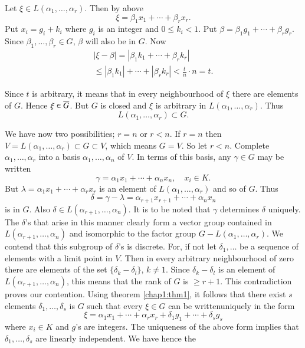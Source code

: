 Let $\xi\in L(\alpha_{1},\ldots,\alpha_{r})$. Then by above
$$
\xi=\beta_{1}x_{1}+\cdots+\beta_{r}x_{r}.
$$
Put $x_{i}=g_{i}+k_{i}$ where $g_{i}$ is an integer and $0\leqslant
k_{i}<1$. Put $\beta=\beta_{1}g_{1}+\cdots+\beta_{r}g_{r}$. Since
$\beta_{1},\ldots,\beta_{r}\in G$, $\beta$ will also be in $G$. Now
\begin{gather*}
|\xi-\beta|=|\beta_{1}k_{1}+\cdots+\beta_{r}k_{r}|\\
\leqslant |\beta_{1}k_{1}|+\cdots+|\beta_{r}k_{r}|<\frac{t}{n}\cdot n=t.
\end{gather*}\pageoriginale

Since $t$ is arbitrary, it means that in every neighbourhood of $\xi$
there are elements of $G$. Hence $\xi\in\overline{G}$. But $G$ is closed and
$\xi$ is arbitrary in $L(\alpha_{1},\ldots,\alpha_{r})$. Thus
$$
L(\alpha_{1},\ldots,\alpha_{r})\subset G.
$$

We have now two possibilities; $r=n$ or $r<n$. If $r=n$ then
$V=L(\alpha_{1},\ldots,\alpha_{r})\subset G\subset V$, which means
$G=V$. So let $r<n$. Complete $\alpha_{1},\ldots,\alpha_{r}$ into a
basis $\alpha_{1},\ldots,\alpha_{n}$ of $V$. In terms of this basis,
any $\gamma\in G$ may be written
$$
\gamma=\alpha_{1}x_{1}+\cdots+\alpha_{n}x_{n},\quad x_{i}\in K.
$$
But $\lambda=\alpha_{1}x_{1}+\cdots+\alpha_{r}x_{r}$ is an element of
$L(\alpha_{1},\ldots,\alpha_{r})$ and so of $G$. Thus
$$
\delta=\gamma-\lambda=\alpha_{r+1}x_{r+1}+\cdots+\alpha_{n}x_{n}
$$
is in $G$. Also $\delta\in L(\alpha_{r+1},\ldots,\alpha_{n})$. It is
to be noted that $\gamma$ determines $\delta$ uniquely. The $\delta$'s
that arise in this manner clearly form a vector group contained in
$L(\alpha_{r+1},\ldots,\alpha_{n})$ and isomorphic to the factor
group $G-L(\alpha_{1},\ldots,\alpha_{r})$. We contend that this
subgroup of $\delta$'s is discrete. For, if not let
$\delta_{1},\ldots$ be a sequence of elements with a limit point in
$V$. Then in every arbitrary neighbourhood of zero there are elements
of the set $\{\delta_{k}-\delta_{l}\}$, $k\neq 1$. Since
$\delta_{k}-\delta_{l}$ is an element of
$L(\alpha_{r+1},\ldots,\alpha_{n})$, this means that the rank of $G$
is $\geqslant r+1$. This contradiction proves our contention. Using
theorem \ref{chap1:thm1}, it follows that there exist $s$ elements
$\delta_{1},\ldots,\delta_{s}$ is $G$ such that every $\xi\in G$ can
be written\pageoriginale uniquely in the form
\begin{equation*}
\xi=\alpha_{1}x_{1}+\cdots+\alpha_{r}x_{r}
+\delta_{1}g_{1}+\cdots+\delta_{s}g_{s}\tag{$\ast$} 
\end{equation*}
where $x_{i}\in K$ and $g$'s are integers. The uniqueness of the above
form implies that $\delta_{1},\ldots,\delta_{s}$ are linearly
independent. We have hence the

